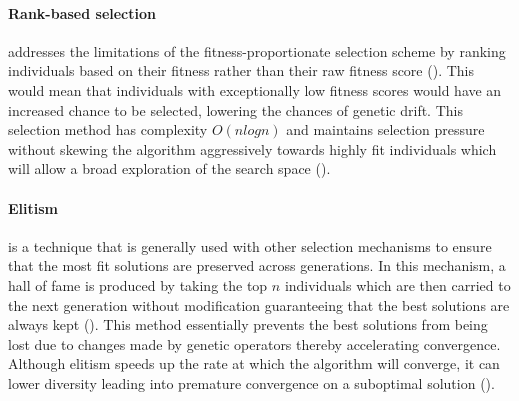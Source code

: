 \parbreak\noindent \paragraph{Rank-based selection} addresses the limitations of the fitness-proportionate selection scheme by ranking individuals based on their fitness rather than their raw fitness score (\cite{mitchell1998introduction}). This would mean that individuals with exceptionally low fitness scores would have an increased chance to be selected, lowering the chances of genetic drift. This selection method has complexity $O(n log n)$ and maintains selection pressure without skewing the algorithm aggressively towards highly fit individuals which will allow a broad exploration of the search space (\cite{mitchell1998introduction}).

\parbreak\noindent \paragraph{Elitism} is a technique that is generally used with other selection mechanisms to ensure that the most fit solutions are preserved across generations. In this mechanism, a hall of fame is produced by taking the top $n$ individuals which are then carried to the next generation without modification guaranteeing that the best solutions are always kept (\cite{mitchell1998introduction}). This method essentially prevents the best solutions from being lost due to changes made by genetic operators thereby accelerating convergence. Although elitism speeds up the rate at which the algorithm will converge, it can lower diversity leading into premature convergence on a suboptimal solution (\cite{malik2014preventing}).

